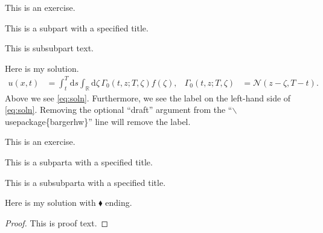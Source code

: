 \documentclass[11pt]{article}
\begin{document}
\begin{exercise}
This is an exercise.

	\begin{subpart}
	This is a subpart with a specified title.
		\begin{subsubpart}
		This is subsubpart text.
		\end{subsubpart}
	\end{subpart}

\end{exercise}

\begin{solution}
Here is my solution.
\begin{align}
u(x,t)
	&= \int_t^T \mathrm{d} s \int_{\mathds{R}} \mathrm{d} \zeta\, \Gamma_0\left( t, z; T, \zeta \right) f(\zeta), &
\Gamma_0(t,z;T,\zeta)
	&= \mathcal{N}(z - \zeta, T-t). \label{eq:soln}
\end{align}
Above we see \eqref{eq:soln}. Furthermore, we see the label on the left-hand side of \eqref{eq:soln}. Removing the optional ``draft'' argument from the ``$\backslash$usepackage\{bargerhw\}'' line will remove the label.
\end{solution}



\begin{exercise}
This is an exercise.

	\begin{subparta}
	This is a subparta with a specified title.
		\begin{subsubparta}
		This is a subsubparta with a specified title.
		\end{subsubparta}
	\end{subparta}

\end{exercise}

\begin{solution}[$\blacklozenge$]
Here is my solution with $\blacklozenge$ ending.


\begin{proof}
	This is proof text.
\end{proof}

\end{solution}
\end{document}
